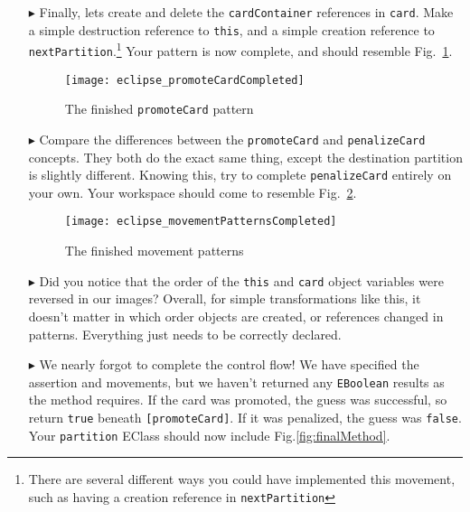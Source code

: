 \begin{itemize}
\item[$\blacktriangleright$] Finally, lets create and delete the \texttt{cardContainer} references in \texttt{card}. Make a simple destruction reference to
\texttt{this}, and a simple creation reference to \texttt{nextPartition}.\footnote{There are several different ways you could have implemented this movement, such as having a
creation reference in \texttt{nextPartition}} Your pattern is now complete, and should resemble Fig.~\ref{fig:completedPromote}.

\begin{figure}[htbp]
\begin{center}
  \texttt{[image: eclipse\_promoteCardCompleted]}
  \caption{The finished \texttt{promoteCard} pattern}
  \label{fig:completedPromote}
\end{center}
\end{figure} 

\item[$\blacktriangleright$] Compare the differences between the \texttt{promoteCard} and \texttt{penalizeCard} concepts. They both do the exact same thing,
except the destination partition is slightly different. Knowing this, try to complete \texttt{penalizeCard} entirely on your own. Your workspace should come to
resemble Fig.~\ref{fig:completedPatterns}.

\begin{figure}[htbp]
\begin{center}
  \texttt{[image: eclipse\_movementPatternsCompleted]}
  \caption{The finished movement patterns}
  \label{fig:completedPatterns}
\end{center}
\end{figure}


\item[$\blacktriangleright$] Did you notice that the order of the \texttt{this} and \texttt{card} object variables were reversed in our images?
Overall, for simple transformations like this, it doesn't matter in which order objects are created, or references changed in patterns. Everything just needs to
be correctly declared.

\item[$\blacktriangleright$] We nearly forgot to complete the control flow! We have specified the assertion and movements, but we haven't returned any
\texttt{EBoolean} results as the method requires. If the card was promoted, the guess was successful, so return \texttt{true} beneath \texttt{[promoteCard]}. If
it was penalized, the guess was \texttt{false}. Your \texttt{partition} EClass should now include Fig.\ref{fig:finalMethod}.


\end{itemize}
